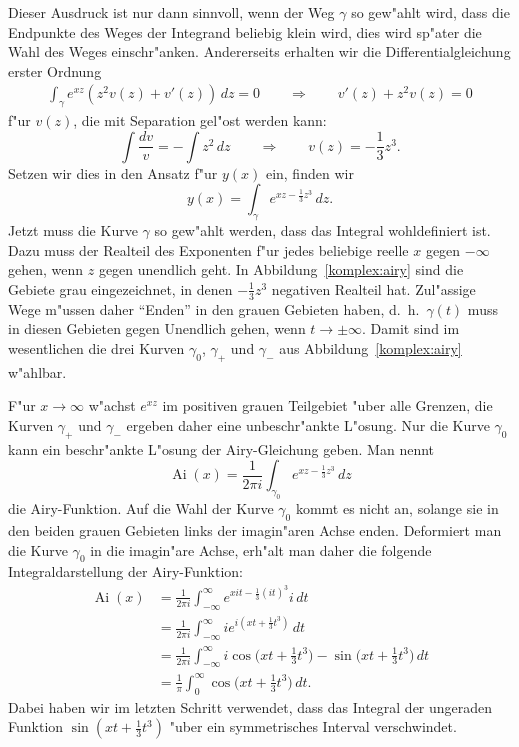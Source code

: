 Dieser Ausdruck ist nur dann sinnvoll, wenn der Weg $\gamma$ so gew"ahlt
wird, dass die Endpunkte des Weges der Integrand beliebig klein wird,
dies wird sp"ater die Wahl des Weges einschr"anken.
Andererseits erhalten wir die Differentialgleichung erster Ordnung
\begin{align*}
\int_\gamma e^{xz}(z^2v(z)+v'(z))\,dz=0
\qquad
\Rightarrow
\qquad
v'(z)+z^2v(z)=0
\end{align*}
f"ur $v(z)$, die mit Separation gel"ost werden kann:
\[
\int \frac{dv}{v}=-\int z^2\,dz
\qquad\Rightarrow\qquad
v(z)=-\frac13z^3.
\]
Setzen wir dies in den Ansatz f"ur $y(x)$ ein, finden wir
\[
y(x)=\int_\gamma e^{xz-\frac13z^3}\,dz.
\]
Jetzt muss die Kurve $\gamma$ so gew"ahlt werden, dass das Integral
wohldefiniert ist. 
Dazu muss der Realteil des Exponenten f"ur jedes beliebige reelle $x$ 
gegen $-\infty$ gehen, wenn $z$ gegen unendlich geht.
In Abbildung~\ref{komplex:airy} sind die Gebiete grau eingezeichnet,
in denen $-\frac13z^3$ negativen Realteil hat.
Zul"assige Wege m"ussen daher ``Enden'' in den grauen Gebieten haben,
d.~h.~$\gamma(t)$ muss in diesen Gebieten gegen Unendlich gehen, wenn
$t\to\pm\infty$.
Damit sind im wesentlichen die drei Kurven $\gamma_0$, $\gamma_+$ und
$\gamma_-$ aus Abbildung~\ref{komplex:airy} w"ahlbar.

F"ur $x\to\infty$ w"achst $e^{xz}$ im positiven grauen Teilgebiet
"uber alle Grenzen, die Kurven $\gamma_+$ und $\gamma_-$ ergeben daher
eine unbeschr"ankte L"osung.
Nur die Kurve $\gamma_0$ kann ein beschr"ankte L"osung der Airy-Gleichung
geben.
Man nennt
\[
\operatorname{Ai}(x)
=
\frac{1}{2\pi i}\int_{\gamma_0} e^{xz-\frac13z^3}\,dz
\]
die Airy-Funktion.
Auf die Wahl der Kurve $\gamma_0$ kommt es nicht an, solange sie in den
beiden grauen Gebieten links der imagin"aren Achse enden.
Deformiert man die Kurve $\gamma_0$ in die imagin"are Achse, erh"alt
man daher die folgende Integraldarstellung der Airy-Funktion:
\begin{align*}
\operatorname{Ai}(x)
&=
\frac1{2\pi i}\int_{-\infty}^{\infty} e^{xit-\frac13(it)^3}i\,dt
\\
&=\frac{1}{2\pi i}\int_{-\infty}^{\infty} ie^{i(xt+\frac13t^3)}\,dt
\\
&=
\frac{1}{2\pi i}\int_{-\infty}^{\infty}
i\cos\biggl(xt+\frac13t^3\biggr)-\sin\biggl(xt+\frac13t^3\biggr)\,dt
\\
&=\frac{1}{\pi}\int_0^{\infty}\cos\biggl(xt+\frac13t^3\biggr)\,dt.
\end{align*}
Dabei haben wir im letzten Schritt verwendet, dass das Integral der
ungeraden Funktion $\sin(xt+\frac13t^3)$ "uber ein symmetrisches
Interval verschwindet.

